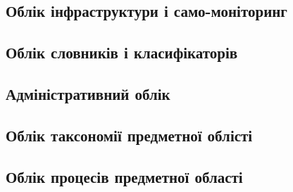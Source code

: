 \subsection{Облік інфраструктури і само-моніторинг}

\subsection{Облік словників і класифікаторів}

\subsection{Адміністративний облік}

\subsection{Облік таксономії предметної облісті}

\subsection{Облік процесів предметної області}

